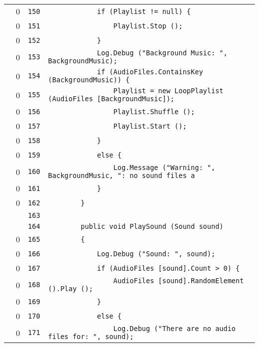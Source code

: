 \documentclass[a4paper,10pt]{article}
\begin{document}
\begin{longtable}[l]{lrrl}
\cellcolor{red} & 0 & \verb~150~ & \verb~            if (Playlist != null) {~\\
\cellcolor{red} & 0 & \verb~151~ & \verb~                Playlist.Stop ();~\\
\cellcolor{red} & 0 & \verb~152~ & \verb~            }~\\
\cellcolor{red} & 0 & \verb~153~ & \verb~            Log.Debug ("Background Music: ", BackgroundMusic);~\\
\cellcolor{red} & 0 & \verb~154~ & \verb~            if (AudioFiles.ContainsKey (BackgroundMusic)) {~\\
\cellcolor{red} & 0 & \verb~155~ & \verb~                Playlist = new LoopPlaylist (AudioFiles [BackgroundMusic]);~\\
\cellcolor{red} & 0 & \verb~156~ & \verb~                Playlist.Shuffle ();~\\
\cellcolor{red} & 0 & \verb~157~ & \verb~                Playlist.Start ();~\\
\cellcolor{red} & 0 & \verb~158~ & \verb~            }~\\
\cellcolor{red} & 0 & \verb~159~ & \verb~            else {~\\
\cellcolor{red} & 0 & \verb~160~ & \verb~                Log.Message ("Warning: ", BackgroundMusic, ": no sound files a~\\
\cellcolor{red} & 0 & \verb~161~ & \verb~            }~\\
\cellcolor{red} & 0 & \verb~162~ & \verb~        }~\\
\cellcolor{gray} &  & \verb~163~ & \verb~~\\
\cellcolor{gray} &  & \verb~164~ & \verb~        public void PlaySound (Sound sound)~\\
\cellcolor{red} & 0 & \verb~165~ & \verb~        {~\\
\cellcolor{red} & 0 & \verb~166~ & \verb~            Log.Debug ("Sound: ", sound);~\\
\cellcolor{red} & 0 & \verb~167~ & \verb~            if (AudioFiles [sound].Count > 0) {~\\
\cellcolor{red} & 0 & \verb~168~ & \verb~                AudioFiles [sound].RandomElement ().Play ();~\\
\cellcolor{red} & 0 & \verb~169~ & \verb~            }~\\
\cellcolor{red} & 0 & \verb~170~ & \verb~            else {~\\
\cellcolor{red} & 0 & \verb~171~ & \verb~                Log.Debug ("There are no audio files for: ", sound);~\\

\end{longtable}
\end{document}
